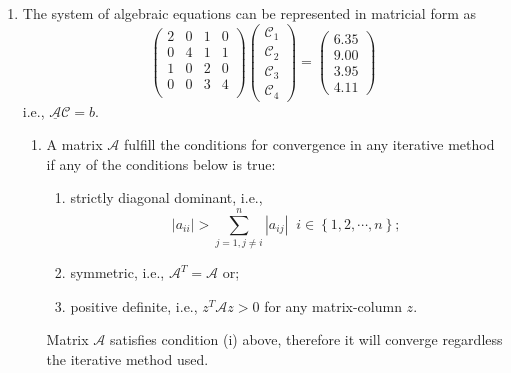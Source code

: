 \documentclass[12pts,a4paper,amsmath,amssymb,floatfix]{article}%
\begin{document}
\begin{enumerate}
\item The system of algebraic equations can be represented in matricial form as
\begin{displaymath} 
\begin{pmatrix}
2 & 0 & 1 & 0 \\
0 & 4 & 1 & 1 \\
1 & 0 & 2 & 0 \\
0 & 0 & 3 & 4 \\
\end{pmatrix}
\begin{pmatrix}
\mathcal{C}_{1} \\ \mathcal{C}_{2} \\ \mathcal{C}_{3} \\ \mathcal{C}_{4} 
\end{pmatrix}=
\begin{pmatrix}
6.35 \\ 9.00 \\ 3.95 \\ 4.11 
\end{pmatrix}
\end{displaymath}
i.e., $\underline{\mathcal{A}}\mathcal{C} = b$. 
\begin{enumerate}
\item A matrix $\mathcal{A}$ fulfill the conditions for convergence in any iterative method if any of the conditions below is true:
\begin{enumerate}
\item\label{diagonal} strictly diagonal dominant, i.e., 
\begin{displaymath}
\left|a_{ii}\right| > \sum\limits_{j=1,j\neq i}^{n} \left|a_{ij}\right|\;\; i\in\left\{1,2,\cdots,n\right\};
\end{displaymath}
\item symmetric, i.e., $\mathcal{A}^{T}=\mathcal{A}$ or;
\item positive definite, i.e., $z^{T}\mathcal{A}z>0$ for any matrix-column $z$.
\end{enumerate}
Matrix $\mathcal{A}$ satisfies condition (i) above, therefore it will converge regardless the iterative method used. 


\end{enumerate}
\end{enumerate}
\end{document}
